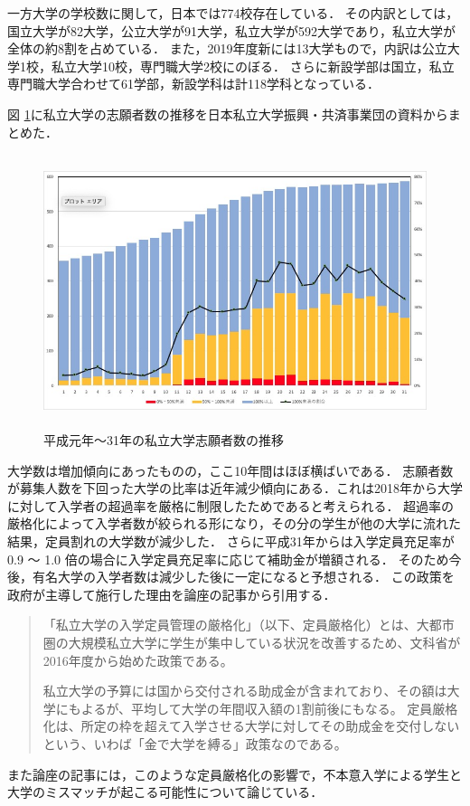 一方大学の学校数に関して，日本では774校存在している\cite{university_num}．
その内訳としては，国立大学が82大学，公立大学が91大学，私立大学が592大学であり，私立大学が全体の約8割を占めている．
また，2019年度新には13大学もので，内訳は公立大学1校，私立大学10校，専門職大学2校にのぼる．
さらに新設学部は国立，私立専門職大学合わせて61学部，新設学科は計118学科となっている．

図 \ref{fig:shigan}に私立大学の志願者数の推移を日本私立大学振興・共済事業団の資料\cite{shigan}からまとめた．
\begin{figure}[H]
\centering
\includegraphics[height=8cm]{images/shigansya.jpg}
\caption{平成元年〜31年の私立大学志願者数の推移}
\label{fig:shigan}
\end{figure}
大学数は増加傾向にあったものの，ここ10年間はほぼ横ばいである．
志願者数が募集人数を下回った大学の比率は近年減少傾向にある．これは2018年から大学に対して入学者の超過率を厳格に制限\cite{hojokin1}したためであると考えられる．
超過率の厳格化によって入学者数が絞られる形になり，その分の学生が他の大学に流れた結果，定員割れの大学数が減少した．
さらに平成31年からは入学定員充足率が 0.9 〜 1.0 倍の場合に入学定員充足率に応じて補助金が増額される\cite{hojokin2}．
そのため今後，有名大学の入学者数は減少した後に一定になると予想される．
この政策を政府が主導して施行した理由を論座の記事\cite{ronza}から引用する．
\begin{quotation}
「私立大学の入学定員管理の厳格化」（以下、定員厳格化）とは、大都市圏の大規模私立大学に学生が集中している状況を改善するため、文科省が2016年度から始めた政策である。

私立大学の予算には国から交付される助成金が含まれており、その額は大学にもよるが、平均して大学の年間収入額の1割前後にもなる。
定員厳格化は、所定の枠を超えて入学させる大学に対してその助成金を交付しないという、いわば「金で大学を縛る」政策なのである。
\end{quotation}
また論座の記事には，このような定員厳格化の影響で，不本意入学による学生と大学のミスマッチが起こる可能性について論じている．

